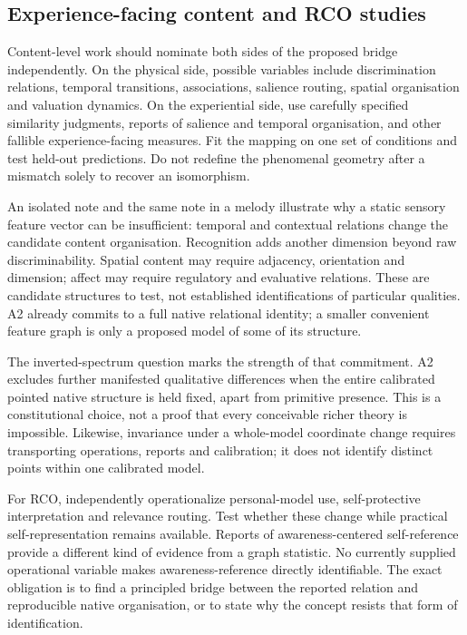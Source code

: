 \documentclass[
  11pt,
  a4paper,
]{article}
\begin{document}
\subsection{Experience-facing content and RCO
studies}\label{experience-facing-content-and-rco-studies}

Content-level work should nominate both sides of the proposed bridge
independently. On the physical side, possible variables include
discrimination relations, temporal transitions, associations, salience
routing, spatial organisation and valuation dynamics. On the
experiential side, use carefully specified similarity judgments, reports
of salience and temporal organisation, and other fallible
experience-facing measures. Fit the mapping on one set of conditions and
test held-out predictions. Do not redefine the phenomenal geometry after
a mismatch solely to recover an isomorphism.

An isolated note and the same note in a melody illustrate why a static
sensory feature vector can be insufficient: temporal and contextual
relations change the candidate content organisation. Recognition adds
another dimension beyond raw discriminability. Spatial content may
require adjacency, orientation and dimension; affect may require
regulatory and evaluative relations. These are candidate structures to
test, not established identifications of particular qualities. A2
already commits to a full native relational identity; a smaller
convenient feature graph is only a proposed model of some of its
structure.

The inverted-spectrum question marks the strength of that commitment. A2
excludes further manifested qualitative differences when the entire
calibrated pointed native structure is held fixed, apart from primitive
presence. This is a constitutional choice, not a proof that every
conceivable richer theory is impossible. Likewise, invariance under a
whole-model coordinate change requires transporting operations, reports
and calibration; it does not identify distinct points within one
calibrated model.

For RCO, independently operationalize personal-model use,
self-protective interpretation and relevance routing. Test whether these
change while practical self-representation remains available. Reports of
awareness-centered self-reference provide a different kind of evidence
from a graph statistic. No currently supplied operational variable makes
awareness-reference directly identifiable. The exact obligation is to
find a principled bridge between the reported relation and reproducible
native organisation, or to state why the concept resists that form of
identification.
\end{document}

